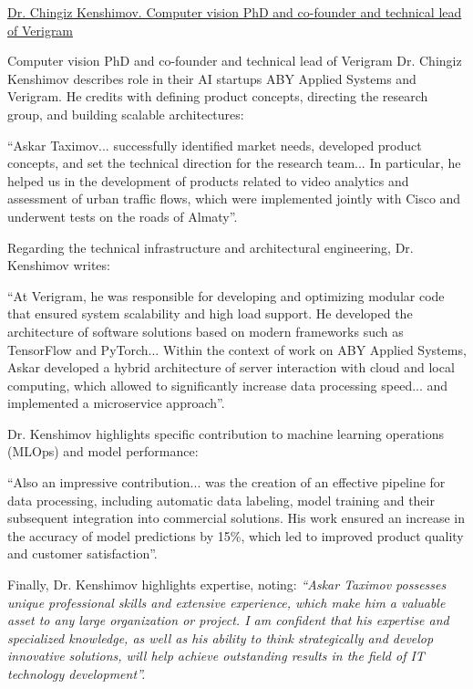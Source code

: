 \bigskip
\noindent\underline{Dr. Chingiz Kenshimov. Computer vision PhD and co-founder and technical lead of Verigram}

Computer vision PhD and co-founder and technical lead of Verigram Dr. Chingiz Kenshimov describes \mrls role in their AI startups ABY Applied Systems and Verigram. He credits \mrl{} with defining product concepts, directing the research group, and building scalable architectures:
\begin{fullquote}
``Askar Taximov... successfully identified market needs, developed product concepts, and set the technical direction for the research team... In particular, he helped us in the development of products related to video analytics and assessment of urban traffic flows, which were implemented jointly with Cisco and underwent tests on the roads of Almaty''.
\end{fullquote}

Regarding the technical infrastructure and architectural engineering, Dr. Kenshimov writes:
\begin{fullquote}
``At Verigram, he was responsible for developing and optimizing modular code that ensured system scalability and high load support. He developed the architecture of software solutions based on modern frameworks such as TensorFlow and PyTorch... Within the context of work on ABY Applied Systems, Askar developed a hybrid architecture of server interaction with cloud and local computing, which allowed to significantly increase data processing speed... and implemented a microservice approach''.
\end{fullquote}

Dr. Kenshimov highlights \mrls specific contribution to machine learning operations (MLOps) and model performance:
\begin{fullquote}
``Also an impressive contribution... was the creation of an effective pipeline for data processing, including automatic data labeling, model training and their subsequent integration into commercial solutions. His work ensured an increase in the accuracy of model predictions by 15\%, which led to improved product quality and customer satisfaction''.
\end{fullquote}

Finally, Dr. Kenshimov highlights \mrls expertise, noting:
\emph{``Askar Taximov possesses unique professional skills and extensive experience, which make him a valuable asset to any large organization or project. I am confident that his expertise and specialized knowledge, as well as his ability to think strategically and develop innovative solutions, will help achieve outstanding results in the field of IT technology development''.}  

